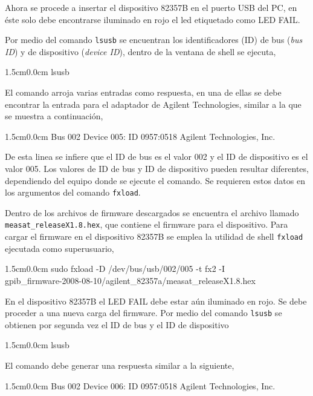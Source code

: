 \documentclass[paper=letter,oneside,fontsize=11pt, parskip=full]{scrartcl}
\newenvironment{code}
	{\begin{adjustwidth}{1.5cm}{0.0cm}\ttfamily}
	{\end{adjustwidth}}
\begin{document}
		Ahora se procede a insertar el dispositivo 82357B en el puerto USB del PC, en éste solo debe encontrarse iluminado en rojo el led etiquetado como LED FAIL. 
		
		Por medio del comando \texttt{lsusb} se encuentran los identificadores (ID) de bus (\emph{bus ID}) y de dispositivo (\emph{device ID}), dentro de la ventana de shell se ejecuta,
		
		\begin{code}
			lsusb
		\end{code}
		
		El comando arroja varias entradas como respuesta, en una de ellas se debe encontrar la entrada para el adaptador de Agilent Technologies, similar a la que se muestra a continuación,
	
		\begin{code}
			Bus 002 Device 005: ID 0957:0518 Agilent Technologies, Inc.
		\end{code}
		
		De esta linea se infiere que el ID de bus es el valor 002 y el ID de dispositivo es el valor 005. Los valores de ID de bus y ID de dispositivo pueden resultar diferentes, dependiendo del equipo donde se ejecute el comando. Se requieren estos datos en los argumentos del comando \texttt{fxload}.
		
		Dentro de los archivos de firmware descargados se encuentra el archivo llamado \texttt{measat\_releaseX1.8.hex}, que contiene el firmware para el dispositivo. Para cargar el firmware en el dispositivo 82357B se emplea la utilidad de shell \texttt{fxload} ejecutada como superusuario, 
		
		\begin{code}
			sudo fxload -D /dev/bus/usb/002/005  -t fx2 -I \\ gpib\_firmware-2008-08-10/agilent\_82357a/measat\_releaseX1.8.hex
		\end{code}
		
		En el dispositivo 82357B el LED FAIL debe estar aún iluminado en rojo. Se debe proceder a una nueva carga del firmware. Por medio del comando \texttt{lsusb} se obtienen por segunda vez el ID de bus y el ID de dispositivo
		
		\begin{code}
			lsusb
		\end{code}
	
		El comando debe generar una respuesta similar a la siguiente,
		
		\begin{code}
			Bus 002 Device 006: ID 0957:0518 Agilent Technologies, Inc.
		\end{code}
		
\end{document}
